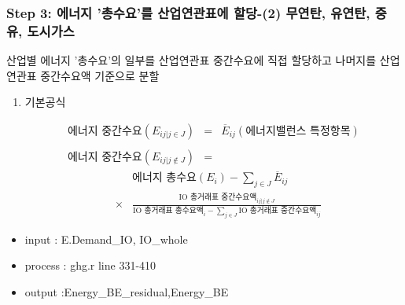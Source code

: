 \documentclass[10pt,compress,slidetop,%
			   hyperref={unicode},xcolor={svgnames},%
			   t]{beamer}
\begin{document}
\begin{frame}
	\frametitle{Step 3: 에너지 '총수요'를 산업연관표에 할당-(2) 무연탄, 유연탄, 중유, 도시가스}
\bigskip
산업별 에너지 '총수요'의 일부를 산업연관표 중간수요에 직접 할당하고 나머지를 산업연관표 중간수요액 기준으로 분할
\smallskip
\begin{small}
\begin{enumerate}
\item{기본공식}

\begin{eqnarray*}
\mbox{에너지 중간수요} (E_{ij|j\in J})&=&\overline{E}_{ij}(\mbox{에너지밸런스 특정항목})\\
&&\\
\mbox{에너지 중간수요} (E_{ij|j \notin J})&=&
\end{eqnarray*}
\begin{eqnarray*}
& &\mbox{에너지 총수요}(E_i)-\sum_{j\in J}\overline{E}_{ij}\\
&\times&\frac{\mbox{IO 총거래표 중간수요액}_{ij| j \notin J}}{\mbox{IO 총거래표 총수요액}_{i}-\sum_{j\in J}\mbox{IO 총거래표 중간수요액}_{ij}}
\end{eqnarray*}



\end{enumerate}
\begin{itemize}
\item{input : E.Demand\_IO, IO\_whole}
\item{process : ghg.r line 331-410}
\item{output :Energy\_BE\_residual,Energy\_BE  }
\end{itemize} 
\end{small}		
\end{frame}
\end{document}
